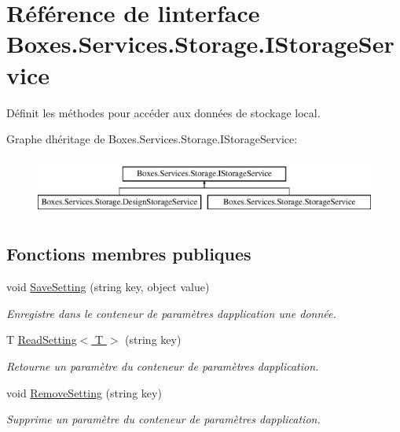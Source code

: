 \hypertarget{interface_boxes_1_1_services_1_1_storage_1_1_i_storage_service}{}\section{Référence de l\textquotesingle{}interface Boxes.\+Services.\+Storage.\+I\+Storage\+Service}
\label{interface_boxes_1_1_services_1_1_storage_1_1_i_storage_service}


Définit les méthodes pour accéder aux données de stockage local.  


Graphe d\textquotesingle{}héritage de Boxes.\+Services.\+Storage.\+I\+Storage\+Service\+:\begin{figure}[H]
\begin{center}
\leavevmode
\includegraphics[height=1.951219cm]{interface_boxes_1_1_services_1_1_storage_1_1_i_storage_service}
\end{center}
\end{figure}
\subsection*{Fonctions membres publiques}
\begin{DoxyCompactItemize}
\item 
void \hyperlink{interface_boxes_1_1_services_1_1_storage_1_1_i_storage_service_a2d6796200cdd63b0a6b5ed55819978b8}{Save\+Setting} (string key, object value)
\begin{DoxyCompactList}\small\item\em Enregistre dans le conteneur de paramètres d\textquotesingle{}application une donnée. \end{DoxyCompactList}\item 
T \hyperlink{interface_boxes_1_1_services_1_1_storage_1_1_i_storage_service_a00a4da789711b03b8e7c8fdaec087d47}{Read\+Setting$<$ T $>$} (string key)
\begin{DoxyCompactList}\small\item\em Retourne un paramètre du conteneur de paramètres d\textquotesingle{}application. \end{DoxyCompactList}\item 
void \hyperlink{interface_boxes_1_1_services_1_1_storage_1_1_i_storage_service_a7138e8e5d1d8f31e227b7765f2206e11}{Remove\+Setting} (string key)
\begin{DoxyCompactList}\small\item\em Supprime un paramètre du conteneur de paramètres d\textquotesingle{}application. \end{DoxyCompactList}\end{DoxyCompactItemize}


